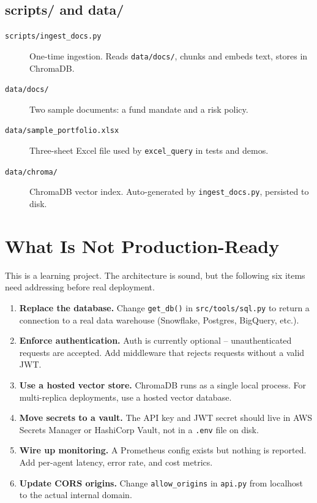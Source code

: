 \documentclass[12pt,a4paper]{article}
\begin{document}
\subsection{scripts/ and data/}

\begin{description}
  \item[\texttt{scripts/ingest\_docs.py}] One-time ingestion. Reads \texttt{data/docs/}, chunks and embeds text, stores in ChromaDB.
  \item[\texttt{data/docs/}] Two sample documents: a fund mandate and a risk policy.
  \item[\texttt{data/sample\_portfolio.xlsx}] Three-sheet Excel file used by \texttt{excel\_query} in tests and demos.
  \item[\texttt{data/chroma/}] ChromaDB vector index. Auto-generated by \texttt{ingest\_docs.py}, persisted to disk.
\end{description}


\section{What Is Not Production-Ready}

This is a learning project. The architecture is sound, but the following six items need addressing before real deployment.

\begin{enumerate}
  \item \textbf{Replace the database.} Change \texttt{get\_db()} in \texttt{src/tools/sql.py} to return a connection to a real data warehouse (Snowflake, Postgres, BigQuery, etc.).
  \item \textbf{Enforce authentication.} Auth is currently optional -- unauthenticated requests are accepted. Add middleware that rejects requests without a valid JWT.
  \item \textbf{Use a hosted vector store.} ChromaDB runs as a single local process. For multi-replica deployments, use a hosted vector database.
  \item \textbf{Move secrets to a vault.} The API key and JWT secret should live in AWS Secrets Manager or HashiCorp Vault, not in a \texttt{.env} file on disk.
  \item \textbf{Wire up monitoring.} A Prometheus config exists but nothing is reported. Add per-agent latency, error rate, and cost metrics.
  \item \textbf{Update CORS origins.} Change \texttt{allow\_origins} in \texttt{api.py} from localhost to the actual internal domain.
\end{enumerate}
\end{document}

